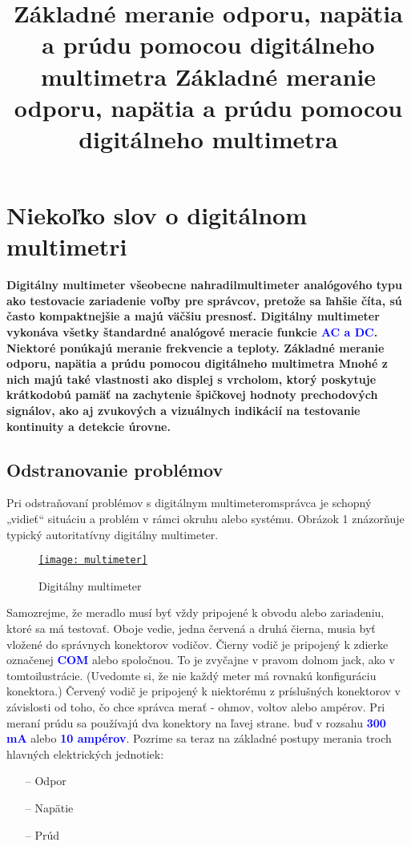 \documentclass[10pt]{article}
\title{Základné meranie odporu, napätia a prúdu pomocou digitálneho multimetra}
\title{{\myfont \color{nadpis} Základné meranie odporu, napätia a prúdu pomocou digitálneho multimetra}\vspace{9pt}}
\date{}
\begin{document}
\maketitle
\section{Niekoľko slov o digitálnom multimetri}
\textrm{\textbf{
Digitálny multimeter všeobecne nahradilmultimeter analógového typu ako testovacie zariadenie voľby pre správcov, pretože sa ľahšie číta, sú často kompaktnejšie a majú väčšiu presnosť. Digitálny multimeter vykonáva všetky štandardné analógové meracie funkcie \textcolor{blue}{\textbf{AC a DC}}. Niektoré ponúkajú meranie frekvencie a teploty.
Základné meranie odporu, napätia a prúdu pomocou digitálneho multimetra
Mnohé z nich majú také vlastnosti ako displej s vrcholom, ktorý poskytuje krátkodobú pamäť na zachytenie špičkovej hodnoty prechodových signálov, ako aj zvukových a vizuálnych indikácií na testovanie kontinuity a detekcie úrovne.
}}

\noindent\makebox[\linewidth]{\rule{\paperwidth}{0.4pt}}
\vspace{2cm}
\subsection{Odstranovanie problémov}
Pri odstraňovaní problémov s digitálnym multimeteromsprávca je schopný „vidieť“ situáciu a problém v rámci okruhu alebo systému. Obrázok 1 znázorňuje typický autoritatívny digitálny multimeter.
\begin{figure}[htbp]
\href{https://crushtymks.com/images/electrical-lectures/basic-measuring-of-resistance-voltage-and-current-using-digital-multimeter.jpg}{\texttt{[image: multimeter]}}
\centering
\caption{Digitálny multimeter}
\end{figure}
Samozrejme, že meradlo musí byť vždy pripojené k obvodu alebo zariadeniu, ktoré sa má testovať. Oboje vedie, jedna červená a druhá čierna, musia byť vložené do správnych konektorov vodičov. Čierny vodič je pripojený k zdierke označenej \textcolor{blue}{\textbf{COM}} alebo spoločnou.
To je zvyčajne v pravom dolnom jack, ako v tomtoilustrácie. (Uvedomte si, že nie každý meter má rovnakú konfiguráciu konektora.) Červený vodič je pripojený k niektorému z príslušných konektorov v závislosti od toho, čo chce správca merať - ohmov, voltov alebo ampérov.
Pri meraní prúdu sa používajú dva konektory na ľavej strane. buď v rozsahu \textcolor{blue}{\textbf{300 mA}} alebo \textcolor{blue}{\textbf{10 ampérov}}.
Pozrime sa teraz na základné postupy merania troch hlavných elektrických jednotiek:
\begin{itemize}
   \item[--] Odpor
   \item[--] Napätie
   \item[--] Prúd
\end{itemize}
\thispagestyle{fancy}%
\end{document}
